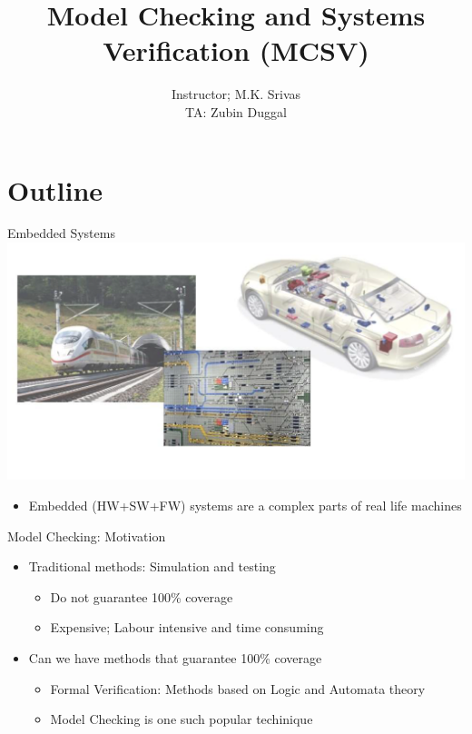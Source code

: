 \documentclass{beamer}
\title{Model Checking and Systems Verification (MCSV)}
\author{Instructor; M.K. Srivas \\
TA: Zubin Duggal}
\begin{document}
\begin{frame}
  \titlepage
\end{frame}


\section{Outline}

\begin{frame}{Embedded Systems}
\includegraphics[scale=0.4]{pics/motivpic.png}
\begin{itemize}
\item Embedded (HW+SW+FW) systems are a complex parts of real life machines
\end{itemize}
\end{frame}

\begin{frame}{Model Checking: Motivation}
\begin{itemize}
\item <1-> Traditional methods: Simulation and testing
\begin{itemize}
\item <2-> Do not guarantee 100\% coverage
\item<3-> Expensive; Labour intensive and time consuming
\end{itemize}

\item<4->Can we have methods that guarantee 100\% coverage
\begin{itemize}
\item<5->Formal Verification: Methods based on Logic and Automata theory
\item<6-> Model Checking is one such popular techinique
\end{itemize}
\end{itemize}
\end{frame}
\end{document}
